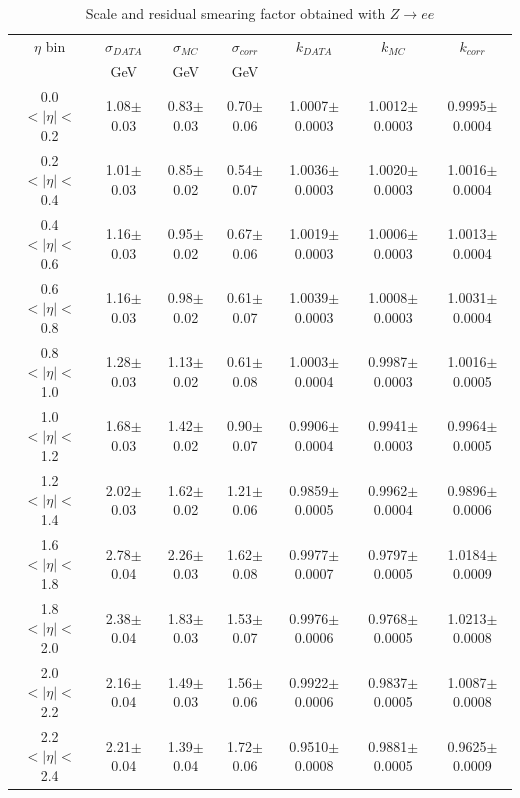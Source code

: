 \begin{table}[htbp]
  \begin{center}
    \begin{tabular}{ccccccc}
$\eta$ bin & $\sigma_{DATA}$ &  $\sigma_{MC}$ & $\sigma_{corr}$ & $k_{DATA}$ &  $k_{MC}$ & $k_{corr}$ \\
&GeV &GeV &GeV & & & \\
\hline
0.0$<|\eta|<$0.2 &1.08$\pm$ 0.03 & 0.83$\pm$ 0.03 & 0.70$\pm$ 0.06 & 1.0007$\pm$ 0.0003 & 1.0012$\pm$ 0.0003 & 0.9995$\pm$ 0.0004 \\ 
0.2$<|\eta|<$0.4 &1.01$\pm$ 0.03 & 0.85$\pm$ 0.02 & 0.54$\pm$ 0.07 & 1.0036$\pm$ 0.0003 & 1.0020$\pm$ 0.0003 & 1.0016$\pm$ 0.0004 \\ 
0.4$<|\eta|<$0.6 &1.16$\pm$ 0.03 & 0.95$\pm$ 0.02 & 0.67$\pm$ 0.06 & 1.0019$\pm$ 0.0003 & 1.0006$\pm$ 0.0003 & 1.0013$\pm$ 0.0004 \\ 
0.6$<|\eta|<$0.8 &1.16$\pm$ 0.03 & 0.98$\pm$ 0.02 & 0.61$\pm$ 0.07 & 1.0039$\pm$ 0.0003 & 1.0008$\pm$ 0.0003 & 1.0031$\pm$ 0.0004 \\ 
0.8$<|\eta|<$1.0 &1.28$\pm$ 0.03 & 1.13$\pm$ 0.02 & 0.61$\pm$ 0.08 & 1.0003$\pm$ 0.0004 & 0.9987$\pm$ 0.0003 & 1.0016$\pm$ 0.0005 \\ 
1.0$<|\eta|<$1.2 &1.68$\pm$ 0.03 & 1.42$\pm$ 0.02 & 0.90$\pm$ 0.07 & 0.9906$\pm$ 0.0004 & 0.9941$\pm$ 0.0003 & 0.9964$\pm$ 0.0005 \\ 
1.2$<|\eta|<$1.4 &2.02$\pm$ 0.03 & 1.62$\pm$ 0.02 & 1.21$\pm$ 0.06 & 0.9859$\pm$ 0.0005 & 0.9962$\pm$ 0.0004 & 0.9896$\pm$ 0.0006 \\ 
1.6$<|\eta|<$1.8 &2.78$\pm$ 0.04 & 2.26$\pm$ 0.03 & 1.62$\pm$ 0.08 & 0.9977$\pm$ 0.0007 & 0.9797$\pm$ 0.0005 & 1.0184$\pm$ 0.0009 \\ 
1.8$<|\eta|<$2.0 &2.38$\pm$ 0.04 & 1.83$\pm$ 0.03 & 1.53$\pm$ 0.07 & 0.9976$\pm$ 0.0006 & 0.9768$\pm$ 0.0005 & 1.0213$\pm$ 0.0008 \\ 
2.0$<|\eta|<$2.2 &2.16$\pm$ 0.04 & 1.49$\pm$ 0.03 & 1.56$\pm$ 0.06 & 0.9922$\pm$ 0.0006 & 0.9837$\pm$ 0.0005 & 1.0087$\pm$ 0.0008 \\ 
2.2$<|\eta|<$2.4 &2.21$\pm$ 0.04 & 1.39$\pm$ 0.04 & 1.72$\pm$ 0.06 & 0.9510$\pm$ 0.0008 & 0.9881$\pm$ 0.0005 & 0.9625$\pm$ 0.0009 \\ 

    \end{tabular}
    \caption{\label{tab:ResCorr}Scale and residual smearing factor obtained with $Z\rightarrow ee$ }
  \end{center}
\end{table}

